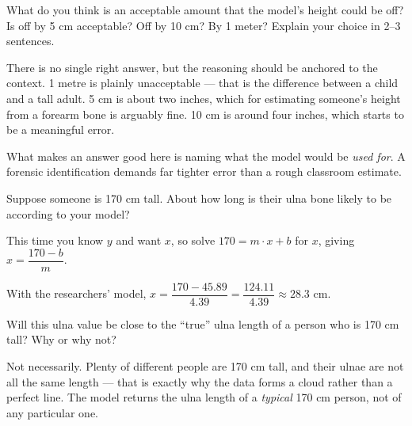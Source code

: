 \documentclass[12pt]{ximera}
\begin{document}
\begin{problem}
What do you think is an acceptable amount that the model's height could be off? Is off
by 5 cm acceptable? Off by 10 cm? By 1 meter? Explain your choice in 2--3 sentences.

\begin{freeResponse}
\end{freeResponse}

\begin{solution}
There is no single right answer, but the reasoning should be anchored to the context. 1
metre is plainly unacceptable --- that is the difference between a child and a tall
adult. 5 cm is about two inches, which for estimating someone's height from a forearm
bone is arguably fine. 10 cm is around four inches, which starts to be a meaningful
error.

What makes an answer good here is naming what the model would be \emph{used for}. A
forensic identification demands far tighter error than a rough classroom estimate.
\end{solution}
\end{problem}

\begin{problem}
Suppose someone is 170 cm tall. About how long is their ulna bone likely to be
according to your model?

\begin{freeResponse}
\end{freeResponse}

\begin{solution}
This time you know $y$ and want $x$, so solve $170 = m \cdot x + b$ for $x$, giving
$x = \dfrac{170 - b}{m}$.

With the researchers' model, $x = \dfrac{170 - 45.89}{4.39} = \dfrac{124.11}{4.39}
\approx 28.3$ cm.
\end{solution}
\end{problem}

\begin{problem}
Will this ulna value be close to the ``true'' ulna length of a person who is 170 cm
tall? Why or why not?

\begin{freeResponse}
\end{freeResponse}

\begin{solution}
Not necessarily. Plenty of different people are 170 cm tall, and their ulnae are not all
the same length --- that is exactly why the data forms a cloud rather than a perfect
line. The model returns the ulna length of a \emph{typical} 170 cm person, not of any
particular one.
\end{solution}
\end{problem}
\end{document}
